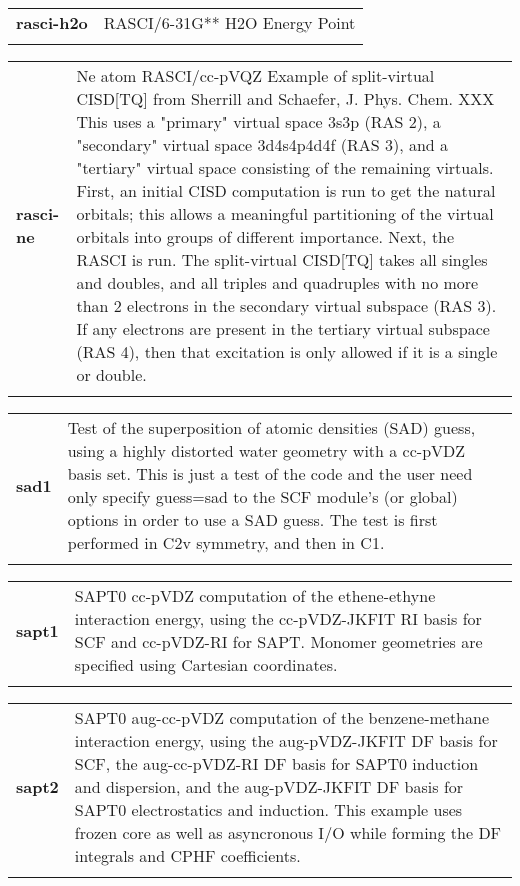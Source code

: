 \begin{tabular*}{\textwidth}[tb]{p{}p{}}
{\bf rasci-h2o} &  RASCI/6-31G** H2O Energy Point \\
\\
\end{tabular*}
\begin{tabular*}{\textwidth}[tb]{p{}p{}}
{\bf rasci-ne} &  Ne atom RASCI/cc-pVQZ  Example of split-virtual CISD[TQ] from Sherrill and Schaefer, J. Phys. Chem. XXX This uses a "primary" virtual space 3s3p (RAS 2), a "secondary" virtual space 3d4s4p4d4f (RAS 3), and a "tertiary" virtual space consisting of the remaining virtuals.  First, an initial CISD computation is run to get the natural orbitals; this allows a meaningful partitioning of the virtual orbitals into groups of different importance.  Next, the RASCI is run.  The split-virtual CISD[TQ] takes all singles and doubles, and all triples and quadruples with no more than 2 electrons in the secondary virtual subspace (RAS 3).  If any electrons are present in the tertiary virtual subspace (RAS 4), then that excitation is only allowed if it is a single or double. \\
\\
\end{tabular*}
\begin{tabular*}{\textwidth}[tb]{p{}p{}}
{\bf sad1} &  Test of the superposition of atomic densities (SAD) guess, using a highly distorted water geometry with a cc-pVDZ basis set.  This is just a test of the code and the user need only specify guess=sad to the SCF module's (or global) options in order to use a SAD guess. The test is first performed in C2v symmetry, and then in C1. \\
\\
\end{tabular*}
\begin{tabular*}{\textwidth}[tb]{p{}p{}}
{\bf sapt1} &  SAPT0 cc-pVDZ computation of the ethene-ethyne interaction energy, using the cc-pVDZ-JKFIT RI basis for SCF and cc-pVDZ-RI for SAPT.  Monomer geometries are specified using Cartesian coordinates. \\
\\
\end{tabular*}
\begin{tabular*}{\textwidth}[tb]{p{}p{}}
{\bf sapt2} &  SAPT0 aug-cc-pVDZ computation of the benzene-methane interaction energy, using the aug-pVDZ-JKFIT DF basis for SCF, the aug-cc-pVDZ-RI DF basis for SAPT0 induction and dispersion, and the aug-pVDZ-JKFIT DF basis for SAPT0 electrostatics and induction. This example uses frozen core as well as asyncronous I/O while forming the DF integrals and CPHF coefficients. \\
\\
\end{tabular*}
